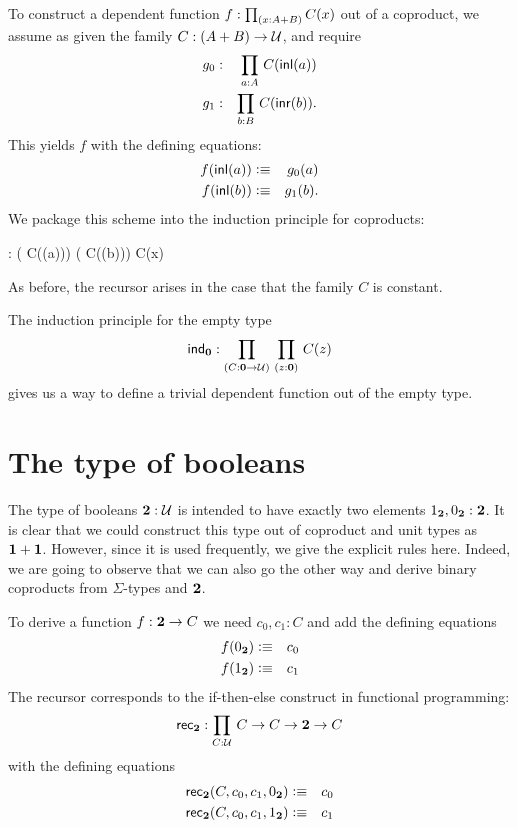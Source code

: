 To construct a dependent function $f:\prd{x:A+B}C(x)$ out of a coproduct, we assume as given the family 
$C: (A + B) \to \mathcal{U}$, and 
require 
\begin{eqnarray*}
  g_0 & : & \prd{a:A} C(\inl(a)) \\
  g_1 & : & \prd{b:B} C(\inr(b)).
\end{eqnarray*}
This yields $f$ with the defining equations:
\begin{eqnarray*}
  f({\mathsf{inl}}(a)) & \vcentcolon\equiv & g_0(a) \\
  f({\mathsf{inl}}(b)) & \vcentcolon\equiv & g_1(b) .
\end{eqnarray*}
We package this scheme into the induction principle for coproducts:
\begin{narrowmultline*}
   :
  \Big( C(\inl(a))\Big) \to \narrowbreak
  \Big( C(\inr(b))\Big) \to {}C(x) 
\end{narrowmultline*}
As before, the recursor arises in the case that the family $C$ is
constant. 

The induction principle for the empty type
\[ \ind{\emptyt} : \prd{C:\emptyt \to \UU}{z:\emptyt} C(z) \]
gives us a way to define a trivial dependent function out of the
empty type. %

%
%


\section{The type of booleans}
\label{sec:type-booleans}

%
The type of booleans $\mathbf{2}:\mathcal{U}$ is intended to have exactly two elements 
${1_{\mathbf{2}}},{0_{\mathbf{2}}} : \mathbf{2}$. It is clear that we could construct this
type out of coproduct and unit types as $\mathbf{1} + \mathbf{1}$. However,
since it is used frequently, we give the explicit rules here.
Indeed, we are going to observe that we can also go the other way
and derive binary coproducts from $\Sigma$-types and $\mathbf{2}$.

To derive a function $f : \mathbf{2} \to C$ we need $c_0,c_1 : C$ and
add the defining equations
\begin{eqnarray*}
  f({0_{\mathbf{2}}}) & \vcentcolon\equiv & c_0 \\
  f({1_{\mathbf{2}}}) & \vcentcolon\equiv & c_1
\end{eqnarray*}
The recursor corresponds to the if-then-else construct in
functional programming:
\[ \rec{\bool} : \prd{C:\UU}  C \to C \to \bool \to C \]
with the defining equations
\begin{eqnarray*}
  \mathsf{rec}_{\mathbf{2}}(C,c_0,c_1,{0_{\mathbf{2}}}) & \vcentcolon\equiv & c_0 \\
  \mathsf{rec}_{\mathbf{2}}(C,c_0,c_1,{1_{\mathbf{2}}}) & \vcentcolon\equiv & c_1
\end{eqnarray*}

